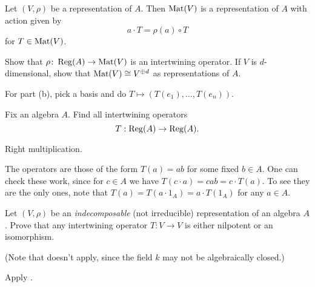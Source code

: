 \begin{sproblem}
	\label{prob:reg_mat}
	Let $(V, \rho)$ be a representation of $A$.
	Then $\mathrm{Mat}(V)$ is a representation of $A$
	with action given by
	\[ a \cdot T = \rho(a) \circ T \]
	for $T \in \mathrm{Mat}(V)$.
	\begin{enumerate}[(a)]
		\ii Show that $\rho \colon \operatorname{Reg}(A) \to \mathrm{Mat}(V)$ is an intertwining operator.
		\ii If $V$ is $d$-dimensional, show that $\mathrm{Mat}(V) \cong V^{\oplus d}$
		as representations of $A$.
	\end{enumerate}
	\begin{hint}
		For part (b), pick a basis and do $T \mapsto (T(e_1), \dots, T(e_n))$.
	\end{hint}
\end{sproblem}

\begin{sproblem}
	\label{prob:regA_intertwine}
	Fix an algebra $A$.
	Find all intertwining operators
	\[ T : \operatorname{Reg}(A) \to \operatorname{Reg}(A). \]
	\begin{hint}
		Right multiplication.
	\end{hint}
	\begin{sol}
		The operators are those of the form $T(a) = ab$
		for some fixed $b \in A$.
		One can check these work, since for $c \in A$
		we have $T(c \cdot a) = cab = c \cdot T(a)$.
		To see they are the only ones, note that
		$T(a) = T(a \cdot 1_A) = a \cdot T(1_A)$ for any $a \in A$.
	\end{sol}
\end{sproblem}

\begin{problem}
	\gim
	Let $(V, \rho)$ be an \emph{indecomposable}
	(not irreducible) representation of an algebra $A$.
	Prove that any intertwining operator $T \colon V \to V$
	is either nilpotent or an isomorphism.

	(Note that  doesn't apply,
	since the field $k$ may not be algebraically closed.)
	\begin{hint}
		Apply .
	\end{hint}
\end{problem}
